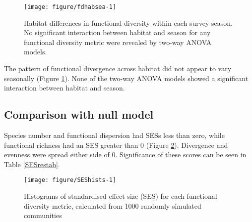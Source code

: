 \documentclass[12pt,a4paper]{article}\usepackage[]{graphicx}\usepackage[]{color}
\newenvironment{knitrout}{}{} %
\begin{document}
\begin{knitrout}
\color{fgcolor}\begin{figure}[h]

{\centering \texttt{[image: figure/fdhabsea-1]} 

}

\caption[Habitat differences in functional diversity within each survey season]{Habitat differences in functional diversity within each survey season. No significant interaction between habitat and season for any functional diversity metric were revealed by two-way ANOVA models.}\label{fig:fdhabsea}
\end{figure}


\end{knitrout}



The pattern of functional divergence across habitat did not appear to vary seasonally (Figure \ref{fig:fdhabsea}). None of the two-way ANOVA models showed a significant interaction between habitat and season.

\clearpage
\subsection{Comparison with null model}
 
Species number and functional dispersion had SESs less than zero, while functional richness had an SES greater than 0 (Figure \ref{fig:SEShists}). Divergence and evenness were spread either side of 0. Significance of these scores can be seen in Table \ref{SESrestab}.

\begin{knitrout}
\color{fgcolor}\begin{figure}[h]

{\centering \texttt{[image: figure/SEShists-1]} 

}

\caption[Histograms of standardised effect size (SES) for each functional diversity metric, calculated from 1000 randomly simulated communities]{Histograms of standardised effect size (SES) for each functional diversity metric, calculated from 1000 randomly simulated communities}\label{fig:SEShists}
\end{figure}


\end{knitrout}
\end{document}
